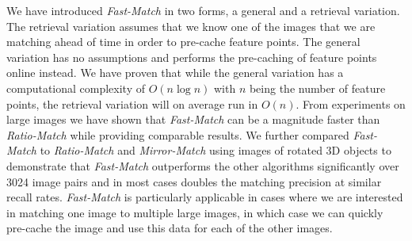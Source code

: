 \documentclass[runningheads]{llncs}
\begin{document}
We have introduced \emph{Fast-Match} in two forms, a general and a retrieval variation. The retrieval variation assumes that we know one of the images that we are matching ahead of time in order to pre-cache feature points. The general variation has no assumptions and performs the pre-caching of feature points online instead. 
We have proven that while the general variation has a computational complexity of $O(n \log n)$ with $n$ being the number of feature points, the retrieval variation will on average run in $O(n)$.
From experiments on large images we have shown that \emph{Fast-Match} can be a magnitude faster than \emph{Ratio-Match} while providing comparable results. We further compared \emph{Fast-Match} to \emph{Ratio-Match} and \emph{Mirror-Match} using images of rotated 3D objects to demonstrate that \emph{Fast-Match} outperforms the other algorithms significantly over 3024 image pairs and in most cases doubles the matching precision at similar recall rates.
\emph{Fast-Match} is particularly applicable in cases where we are interested in matching one image to multiple large images, in which case we can quickly pre-cache the image and use this data for each of the other images.



\end{document}
